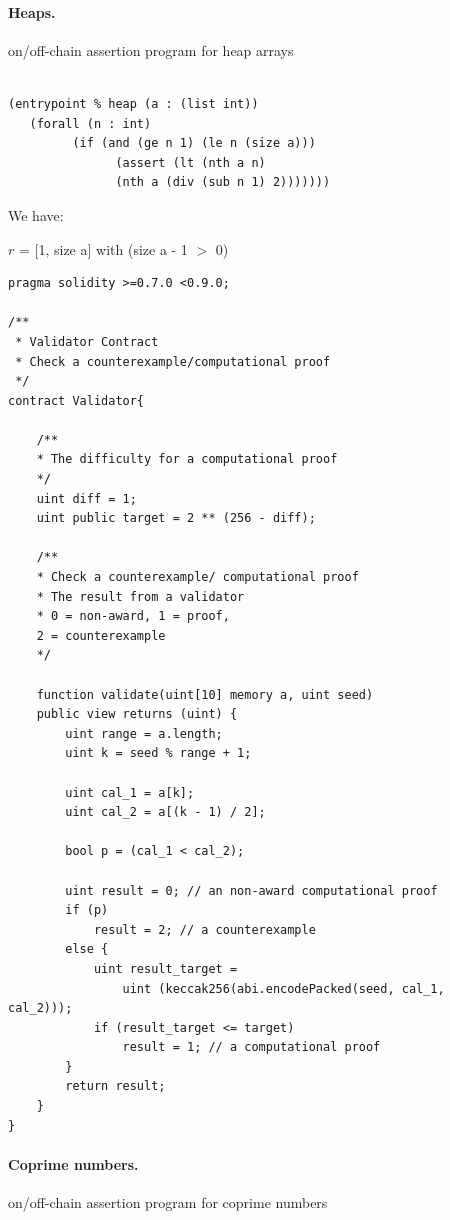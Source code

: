 \documentclass[runningheads]{llncs}
\begin{document}
\paragraph{Heaps.}{ on/off-chain assertion program for heap arrays}

\begin{lstlisting}[numbers=none]

(entrypoint % heap (a : (list int))
   (forall (n : int)
         (if (and (ge n 1) (le n (size a)))
               (assert (lt (nth a n) 
               (nth a (div (sub n 1) 2)))))))
\end{lstlisting}


\noindent We have:

$r$ = [1, size a] with (size a - 1 $>$ 0)


\begin{lstlisting}[numbers=none]
pragma solidity >=0.7.0 <0.9.0;

/**
 * Validator Contract
 * Check a counterexample/computational proof
 */
contract Validator{

    /**
    * The difficulty for a computational proof
    */
    uint diff = 1;
    uint public target = 2 ** (256 - diff); 

    /**
    * Check a counterexample/ computational proof
    * The result from a validator
    * 0 = non-award, 1 = proof, 
    2 = counterexample
    */

    function validate(uint[10] memory a, uint seed) 
    public view returns (uint) {
        uint range = a.length; 
        uint k = seed % range + 1;

        uint cal_1 = a[k];
        uint cal_2 = a[(k - 1) / 2];
        
        bool p = (cal_1 < cal_2);

        uint result = 0; // an non-award computational proof 
        if (p)  
            result = 2; // a counterexample
        else {
            uint result_target = 
                uint (keccak256(abi.encodePacked(seed, cal_1, cal_2)));
            if (result_target <= target) 
                result = 1; // a computational proof      
        }              
        return result;           
    }
}

\end{lstlisting}

\paragraph{Coprime numbers.}{ on/off-chain assertion program for coprime numbers}
\end{document}
